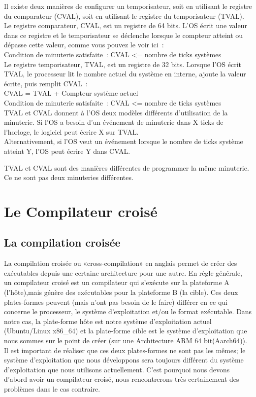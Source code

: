 \documentclass[12pt,a4paper,oneside]{book}
\begin{document}
	Il existe deux manières de configurer un temporisateur, soit en utilisant le registre du comparateur (CVAL), soit en utilisant le registre du temporisateur (TVAL).
	Le registre comparateur, CVAL, est un registre de 64 bits. L'OS écrit une valeur dans ce registre et le temporisateur se déclenche lorsque le
	compteur atteint ou dépasse cette valeur, comme vous pouvez le voir ici : \\
	Condition de minuterie satisfaite : CVAL <= nombre  de ticks systèmes\\
	Le registre temporisateur, TVAL, est un registre de 32 bits. Lorsque l'OS écrit TVAL, le processeur lit le nombre actuel du système
	en interne, ajoute la valeur écrite, puis remplit CVAL :\\
	CVAL = TVAL + Compteur système actuel \\
	Condition de minuterie satisfaite : CVAL <= nombre de ticks systèmes \\
	TVAL et CVAL donnent à l'OS deux modèles différents d'utilisation de la minuterie. Si l'OS a besoin d'un événement de minuterie dans X ticks de
	l'horloge, le logiciel peut écrire X sur TVAL. \\
	Alternativement, si l'OS veut un événement lorsque le nombre de ticks système atteint Y, l'OS peut
	écrire Y dans CVAL.
	
	TVAL et CVAL sont des manières différentes de programmer la même minuterie. Ce ne sont pas deux minuteries différentes.
	
	\section{Le Compilateur croisé}
	\subsection{La compilation croisée}
	La compilation croisée ou «cross-compilation» en anglais permet de créer des exécutables depuis une certaine architecture pour une autre. En règle générale, un compilateur croisé est un compilateur qui s’exécute sur la plateforme A (l’hôte),mais génère des exécutables pour la plateforme B (la cible). Ces deux plates-formes peuvent (mais n’ont pas besoin de le faire) différer en ce qui concerne le processeur, le système d’exploitation et/ou le format exécutable. Dans notre cas, la plate-forme hôte est notre système d’exploitation actuel (Ubuntu/Linux x86\_64) et la plate-forme cible est le système d’exploitation que nous sommes sur le point de créer (sur une Architecture ARM 64 bit(Aarch64)). Il est important de réaliser que ces deux plates-formes ne sont pas les mêmes; le système d’exploitation que nous développons sera toujours différent du système d’exploitation que nous utilisons actuellement. C’est pourquoi nous devons d’abord avoir un compilateur croisé, nous rencontrerons très certainement des problèmes dans le cas contraire.
	
\end{document}
